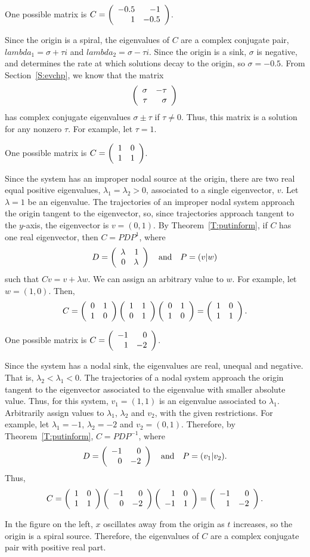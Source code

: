 \ans One possible matrix is $C = \left(\begin{array}{rr} -0.5 & -1\\ 1 &-0.5\end{array}\right)$.

\soln Since the origin is a spiral, the eigenvalues of $C$ are a complex
conjugate pair, $lambda_1 = \sigma + \tau i$ and $lambda_2 = \sigma -
\tau i$.  Since the origin is a sink, $\sigma$ is negative, and determines
the rate at which solutions decay to the origin, so $\sigma = -0.5$.
From Section~\ref{S:evchp}, we know that the matrix
\[ \left(\begin{array}{rr} \sigma & -\tau\\ \tau &\sigma\end{array}\right) \]
has complex conjugate eigenvalues $\sigma \pm \tau$ if $\tau \neq 0$.
Thus, this matrix is a solution for any nonzero $\tau$.  For example,
let $\tau = 1$.

\ans One possible matrix is $C = \left(\begin{array}{rr} 1 & 0\\ 1 &1\end{array}\right)$.

\soln Since the system has an improper nodal source at the origin, there
are two real equal positive eigenvalues, $\lambda_1 = \lambda_2 > 0$,
associated to a single eigenvector, $v$.  Let $\lambda = 1$ be an
eigenvalue.  The trajectories of an improper nodal system approach the
origin tangent to the eigenvector, so, since trajectories approach
tangent to the $y$-axis, the eigenvector is $v = (0,1)$.  By
Theorem~\ref{T:putinform}, if $C$ has one
real eigenvector, then $C = PDP^1$, where
\[ D = \left(\begin{array}{rr} \lambda & 1\\ 0 &\lambda\end{array}\right) \quad\mbox{and}\quad P = (v|w) \]
such that $Cv = v + \lambda w$.  We can assign an arbitrary value to
$w$.  For example, let $w = (1,0)$.  Then,
\[ C = \left(\begin{array}{rr} 0 & 1\\ 1 &0\end{array}\right)\left(\begin{array}{rr} 1 & 1\\ 0 &1\end{array}\right)\left(\begin{array}{rr} 0 & 1\\ 1 &0\end{array}\right) =
\left(\begin{array}{rr} 1 & 0\\ 1 &1\end{array}\right). \]

\ans One possible matrix is $C = \left(\begin{array}{rr} -1 & 0\\ 1 &-2\end{array}\right)$.

\soln Since the system has a nodal sink, the eigenvalues are real, unequal
and negative.  That is, $\lambda_2 < \lambda_1 < 0$.  The trajectories
of a nodal system approach the origin tangent to the eigenvector
associated to the eigenvalue with smaller absolute value.  Thus, for
this system, $v_1 = (1,1)$ is an eigenvalue associated to $\lambda_1$.
Arbitrarily assign values to $\lambda_1$, $\lambda_2$ and $v_2$, with
the given restrictions.  For example, let $\lambda_1 = -1$, $\lambda_2
= -2$ and $v_2 = (0,1)$.  Therefore, by
Theorem~\ref{T:putinform}, $C = PDP^{-1}$, where
\[ D = \left(\begin{array}{rr} -1 & 0\\ 0 &-2\end{array}\right) \quad\mbox{and}\quad P = (v_1|v_2). \]
Thus,
\[ C = \left(\begin{array}{rr} 1 & 0\\ 1 &1\end{array}\right)\left(\begin{array}{rr} -1 & 0\\ 0 &-2\end{array}\right)\left(\begin{array}{rr} 1 & 0\\ -1 &1\end{array}\right) =
\left(\begin{array}{rr} -1 & 0\\ 1 &-2\end{array}\right). \]

In the figure on the left, $x$ oscillates away from the origin as $t$
increases, so the origin is a spiral source.  Therefore, the eigenvalues
of $C$ are a complex conjugate pair with positive real part.

